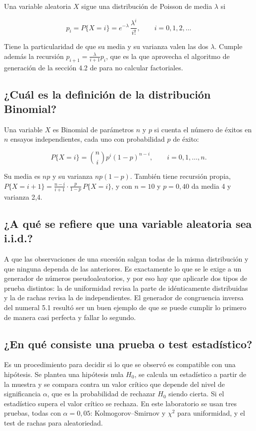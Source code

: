 \documentclass[11pt,letterpaper]{article}
\begin{document}
Una variable aleatoria $X$ sigue una distribución de Poisson de media $\lambda$ si

\[
p_i = P\{X = i\} = e^{-\lambda}\,\frac{\lambda^i}{i!}, \qquad i = 0, 1, 2, \dots
\]

Tiene la particularidad de que su media y su varianza valen las dos $\lambda$. Cumple además la
recursión $p_{i+1} = \frac{\lambda}{i+1}p_i$, que es la que aprovecha el algoritmo de generación de
la sección 4.2 de \cite{ross99} para no calcular factoriales.

\subsection{¿Cuál es la definición de la distribución Binomial?}

Una variable $X$ es Binomial de parámetros $n$ y $p$ si cuenta el número de éxitos en $n$ ensayos
independientes, cada uno con probabilidad $p$ de éxito:

\[
P\{X = i\} = \binom{n}{i} p^i (1-p)^{n-i}, \qquad i = 0, 1, \dots, n.
\]

Su media es $np$ y su varianza $np(1-p)$. También tiene recursión propia,
$P\{X = i+1\} = \frac{n-i}{i+1}\cdot\frac{p}{1-p}\,P\{X = i\}$, y con $n = 10$ y $p = 0{,}40$ da
media 4 y varianza 2,4.

\subsection{¿A qué se refiere que una variable aleatoria sea i.i.d.?}

A que las observaciones de una sucesión salgan todas de la misma distribución y que ninguna dependa
de las anteriores. Es exactamente lo que se le exige a un generador de números pseudoaleatorios, y
por eso hay que aplicarle dos tipos de prueba distintos: la de uniformidad revisa la parte de
idénticamente distribuidas y la de rachas revisa la de independientes. El generador de congruencia
inversa del numeral 5.1 resultó ser un buen ejemplo de que se puede cumplir lo primero de manera casi
perfecta y fallar lo segundo.

\subsection{¿En qué consiste una prueba o test estadístico?}

Es un procedimiento para decidir si lo que se observó es compatible con una hipótesis. Se plantea una
hipótesis nula $H_0$, se calcula un estadístico a partir de la muestra y se compara contra un valor
crítico que depende del nivel de significancia $\alpha$, que es la probabilidad de rechazar $H_0$
siendo cierta. Si el estadístico supera el valor crítico se rechaza. En este laboratorio se usan tres
pruebas, todas con $\alpha = 0{,}05$: Kolmogorov--Smirnov y $\chi^2$ para uniformidad, y el test de
rachas para aleatoriedad.
\end{document}
